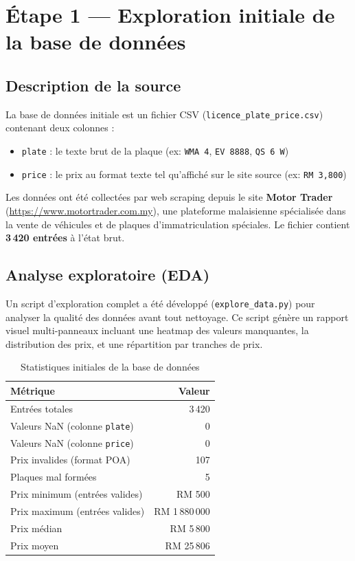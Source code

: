 \documentclass[12pt, a4paper]{article}
\begin{document}
\section{Étape 1 — Exploration initiale de la base de données}

\subsection{Description de la source}

La base de données initiale est un fichier CSV (\texttt{licence\_plate\_price.csv}) contenant deux colonnes :
\begin{itemize}
  \item \texttt{plate} : le texte brut de la plaque (ex: \texttt{WMA 4}, \texttt{EV 8888}, \texttt{QS 6 W})
  \item \texttt{price} : le prix au format texte tel qu'affiché sur le site source (ex: \texttt{RM 3,800})
\end{itemize}

Les données ont été collectées par web scraping depuis le site \textbf{Motor Trader} (\url{https://www.motortrader.com.my}), une plateforme malaisienne spécialisée dans la vente de véhicules et de plaques d'immatriculation spéciales. Le fichier contient \textbf{3\,420 entrées} à l'état brut.

\subsection{Analyse exploratoire (EDA)}

Un script d'exploration complet a été développé (\texttt{explore\_data.py}) pour analyser la qualité des données avant tout nettoyage. Ce script génère un rapport visuel multi-panneaux incluant une heatmap des valeurs manquantes, la distribution des prix, et une répartition par tranches de prix.

\begin{table}[H]
\centering
\begin{tabular}{lr}
\toprule
\textbf{Métrique} & \textbf{Valeur} \\
\midrule
Entrées totales & 3\,420 \\
Valeurs NaN (colonne \texttt{plate}) & 0 \\
Valeurs NaN (colonne \texttt{price}) & 0 \\
Prix invalides (format POA) & 107 \\
Plaques mal formées & 5 \\
Prix minimum (entrées valides) & RM 500 \\
Prix maximum (entrées valides) & RM 1\,880\,000 \\
Prix médian & RM 5\,800 \\
Prix moyen & RM 25\,806 \\
\bottomrule
\end{tabular}
\caption{Statistiques initiales de la base de données}
\end{table}
\end{document}
